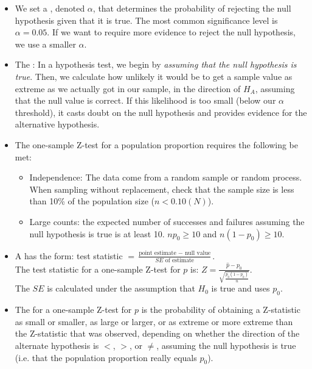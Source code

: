 \begin{itemize}
\item We set a , denoted $\alpha$, that determines the probability of rejecting the null hypothesis given that it is true.  The most common significance level is $\alpha = 0.05$.  If we want to require more evidence to reject the null hypothesis, we use a smaller $\alpha$.

\item The :  In a hypothesis test, we begin by \textit{assuming that the null hypothesis is true}.  Then, we calculate how unlikely it would be to get a sample value as extreme as we actually got in our sample, in the direction of $H_A$, assuming that the null value is correct.  If this likelihood is too small (below our $\alpha$ threshold), it casts doubt on the null hypothesis and provides evidence for the alternative hypothesis.

\item The one-sample Z-test for a population proportion requires the following  be met:  \vspace{-3mm}
\begin{itemize}
\item[1.] Independence:  The data come from a random sample or random process.  When sampling without replacement, check that the sample size is less than 10\% of the population size ($n<0.10(N)$).
\item[2.] Large counts: the expected number of successes and failures assuming the null hypothesis is true is at least 10.  $np_0\ge 10$ and $n(1-p_0)\ge 10$.
\end{itemize}

\item A  has the form: test statistic $= \frac{\text{point estimate } - \text{ null value}}{SE \text{ of estimate}}$.  \\

The test statistic for a one-sample Z-test for $p$ is: $Z = \frac{\hat{p} - p_0}{\sqrt{\frac{p_0(1-p_0)}{n}}}$.\\
The $SE$ is calculated under the assumption that $H_0$ is true and uses $p_0$.


\item The  for a one-sample Z-test for $p$ is the probability of obtaining a Z-statistic as small or smaller, as large or larger, or as extreme or more extreme than the Z-statistic that was observed, depending on whether the direction of the alternate hypothesis is $<$, $>$, or $\ne$, assuming the null hypothesis is true (i.e. that the population proportion really equals $p_0$).  


\end{itemize}
